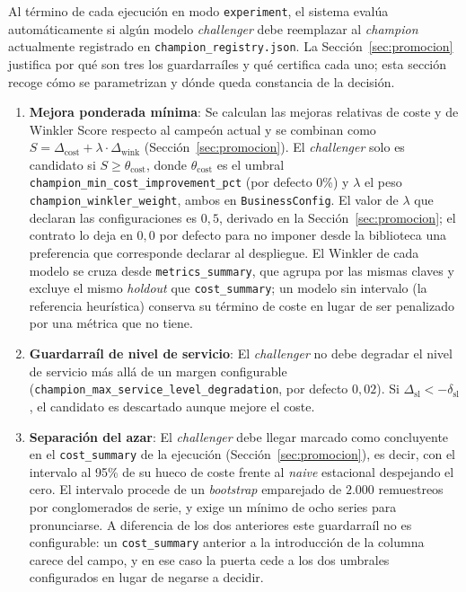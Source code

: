 Al término de cada ejecución en modo \texttt{experiment}, el sistema evalúa automáticamente si algún modelo \textit{challenger} debe reemplazar al \textit{champion} actualmente registrado en \texttt{champion\_registry.json}. La Sección~\ref{sec:promocion} justifica por qué son tres los guardarraíles y qué certifica cada uno; esta sección recoge cómo se parametrizan y dónde queda constancia de la decisión.

\begin{enumerate}
    \item \textbf{Mejora ponderada mínima}: Se calculan las mejoras relativas de coste y de Winkler Score respecto al campeón actual y se combinan como $S = \Delta_{\text{cost}} + \lambda \cdot \Delta_{\text{wink}}$ (Sección~\ref{sec:promocion}). El \textit{challenger} solo es candidato si $S \geq \theta_{\text{cost}}$, donde $\theta_{\text{cost}}$ es el umbral \texttt{champion\_}\allowbreak\texttt{min\_}\allowbreak\texttt{cost\_}\allowbreak\texttt{improvement\_}\allowbreak\texttt{pct} (por defecto 0\%) y $\lambda$ el peso \texttt{champion\_}\allowbreak\texttt{winkler\_}\allowbreak\texttt{weight}, ambos en \texttt{BusinessConfig}. El valor de $\lambda$ que declaran las configuraciones es $0{,}5$, derivado en la Sección~\ref{sec:promocion}; el contrato lo deja en $0{,}0$ por defecto para no imponer desde la biblioteca una preferencia que corresponde declarar al despliegue. El Winkler de cada modelo se cruza desde \texttt{metrics\_}\allowbreak\texttt{summary}, que agrupa por las mismas claves y excluye el mismo \textit{holdout} que \texttt{cost\_}\allowbreak\texttt{summary}; un modelo sin intervalo (la referencia heurística) conserva su término de coste en lugar de ser penalizado por una métrica que no tiene.

    \item \begin{sloppypar}\textbf{Guardarraíl de nivel de servicio}: El \textit{challenger} no debe degradar el nivel de servicio más allá de un margen configurable (\texttt{champion\_}\allowbreak\texttt{max\_}\allowbreak\texttt{service\_}\allowbreak\texttt{level\_}\allowbreak\texttt{degradation}, por defecto $0{,}02$). Si $\Delta_{\text{sl}} < -\delta_{\text{sl}}$, el candidato es descartado aunque mejore el coste.\end{sloppypar}

    \item \textbf{Separación del azar}: El \textit{challenger} debe llegar marcado como concluyente en el \texttt{cost\_}\allowbreak\texttt{summary} de la ejecución (Sección~\ref{sec:promocion}), es decir, con el intervalo al 95\% de su hueco de coste frente al \textit{naive} estacional despejando el cero. El intervalo procede de un \textit{bootstrap} emparejado de $2.000$ remuestreos por conglomerados de serie, y exige un mínimo de ocho series para pronunciarse. A diferencia de los dos anteriores este guardarraíl no es configurable: un \texttt{cost\_}\allowbreak\texttt{summary} anterior a la introducción de la columna carece del campo, y en ese caso la puerta cede a los dos umbrales configurados en lugar de negarse a decidir.
\end{enumerate}

